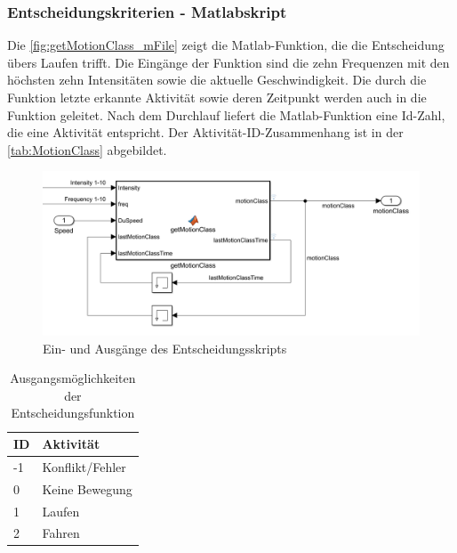 \subsubsection{Entscheidungskriterien - Matlabskript}
%
%
%
%
%
Die \autoref{fig:getMotionClass_mFile} zeigt die Matlab-Funktion, die die Entscheidung übers Laufen trifft. Die Eingänge der Funktion sind die zehn Frequenzen mit den höchsten zehn Intensitäten sowie die aktuelle Geschwindigkeit. Die durch die Funktion letzte erkannte Aktivität sowie deren Zeitpunkt werden auch in die Funktion geleitet. Nach dem Durchlauf liefert die Matlab-Funktion eine Id-Zahl, die eine Aktivität entspricht. Der Aktivität-ID-Zusammenhang ist in der \autoref{tab:MotionClass} abgebildet.

\begin{figure}[H]
	\centering
	\includegraphics[width=\linewidth]{Bilder/getMotionClass_mFile.png}
	\caption{Ein- und Ausgänge des Entscheidungsskripts}
	\label{fig:getMotionClass_mFile}
\end{figure}

\begin{table}[H]
	\caption{Ausgangsmöglichkeiten der Entscheidungsfunktion} 
	\centering
	\begin{tabular}{|l|l|}%
			\hline
			\textbf{ID} & \textbf{Aktivität} \\
			\hline
			-1 & Konflikt/Fehler \\
			\hline
			0 & Keine Bewegung \\
			\hline
			1 & Laufen \\
			\hline
			2 & Fahren \\
			\hline
		\end{tabular}
	\label{tab:MotionClass}
\end{table}

